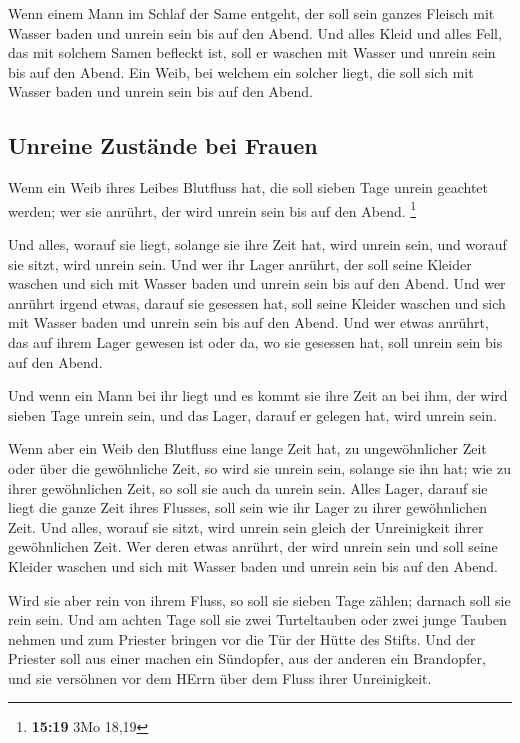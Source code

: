  Wenn einem Mann im Schlaf der Same entgeht, der soll
sein ganzes Fleisch mit Wasser baden und unrein sein bis auf den Abend.
 Und alles Kleid und alles Fell, das mit solchem Samen
befleckt ist, soll er waschen mit Wasser und unrein sein bis auf den
Abend.  Ein Weib, bei welchem ein solcher liegt, die soll
sich mit Wasser baden und unrein sein bis auf den Abend.

\hypertarget{unreine-zustuxe4nde-bei-frauen}{%
\subsection{Unreine Zustände bei
Frauen}\label{unreine-zustuxe4nde-bei-frauen}}

 Wenn ein Weib ihres Leibes Blutfluss hat, die soll
sieben Tage unrein geachtet werden; wer sie anrührt, der wird unrein
sein bis auf den Abend. \footnote{\textbf{15:19} 3Mo 18,19}

 Und alles, worauf sie liegt, solange sie ihre Zeit hat,
wird unrein sein, und worauf sie sitzt, wird unrein sein.
 Und wer ihr Lager anrührt, der soll seine Kleider
waschen und sich mit Wasser baden und unrein sein bis auf den Abend.
 Und wer anrührt irgend etwas, darauf sie gesessen hat,
soll seine Kleider waschen und sich mit Wasser baden und unrein sein bis
auf den Abend.  Und wer etwas anrührt, das auf ihrem
Lager gewesen ist oder da, wo sie gesessen hat, soll unrein sein bis auf
den Abend.

 Und wenn ein Mann bei ihr liegt und es kommt sie ihre
Zeit an bei ihm, der wird sieben Tage unrein sein, und das Lager, darauf
er gelegen hat, wird unrein sein.

 Wenn aber ein Weib den Blutfluss eine lange Zeit hat, zu
ungewöhnlicher Zeit oder über die gewöhnliche Zeit, so wird sie unrein
sein, solange sie ihn hat; wie zu ihrer gewöhnlichen Zeit, so soll sie
auch da unrein sein.  Alles Lager, darauf sie liegt die
ganze Zeit ihres Flusses, soll sein wie ihr Lager zu ihrer gewöhnlichen
Zeit. Und alles, worauf sie sitzt, wird unrein sein gleich der
Unreinigkeit ihrer gewöhnlichen Zeit.  Wer deren etwas
anrührt, der wird unrein sein und soll seine Kleider waschen und sich
mit Wasser baden und unrein sein bis auf den Abend.

 Wird sie aber rein von ihrem Fluss, so soll sie sieben
Tage zählen; darnach soll sie rein sein.  Und am achten
Tage soll sie zwei Turteltauben oder zwei junge Tauben nehmen und zum
Priester bringen vor die Tür der Hütte des Stifts.  Und
der Priester soll aus einer machen ein Sündopfer, aus der anderen ein
Brandopfer, und sie versöhnen vor dem HErrn über dem Fluss ihrer
Unreinigkeit.

